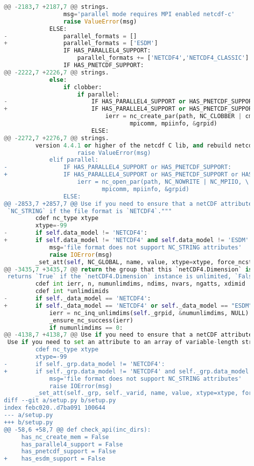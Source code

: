 \begin{lstlisting}[language=python,upquote=true]
@@ -2183,7 +2187,7 @@ strings.
                 msg='parallel mode requires MPI enabled netcdf-c'
                 raise ValueError(msg)
             ELSE:
-                parallel_formats = []
+                parallel_formats = ['ESDM']
                 IF HAS_PARALLEL4_SUPPORT:
                     parallel_formats += ['NETCDF4','NETCDF4_CLASSIC']
                 IF HAS_PNETCDF_SUPPORT:
@@ -2222,7 +2226,7 @@ strings.
             else:
                 if clobber:
                     if parallel:
-                        IF HAS_PARALLEL4_SUPPORT or HAS_PNETCDF_SUPPORT:
+                        IF HAS_PARALLEL4_SUPPORT or HAS_PNETCDF_SUPPORT or HAS_ESDM_SUPPORT:
                             ierr = nc_create_par(path, NC_CLOBBER | cmode, \
                                    mpicomm, mpiinfo, &grpid)
                         ELSE:
@@ -2272,7 +2276,7 @@ strings.
         version 4.4.1 or higher of the netcdf C lib, and rebuild netcdf4-python."""
                     raise ValueError(msg)
             elif parallel:
-                IF HAS_PARALLEL4_SUPPORT or HAS_PNETCDF_SUPPORT:
+                IF HAS_PARALLEL4_SUPPORT or HAS_PNETCDF_SUPPORT or HAS_ESDM_SUPPORT:
                     ierr = nc_open_par(path, NC_NOWRITE | NC_MPIIO, \
                            mpicomm, mpiinfo, &grpid)
                 ELSE:
@@ -2853,7 +2857,7 @@ Use if you need to ensure that a netCDF attribute is created with type
 `NC_STRING` if the file format is `NETCDF4`."""
         cdef nc_type xtype
         xtype=-99
-        if self.data_model != 'NETCDF4':
+        if self.data_model != 'NETCDF4' and self.data_model != 'ESDM':
             msg='file format does not support NC_STRING attributes'
             raise IOError(msg)
         _set_att(self, NC_GLOBAL, name, value, xtype=xtype, force_ncstring=True)
@@ -3435,7 +3435,7 @@ return the group that this `netCDF4.Dimension` is a member of."""
 returns `True` if the `netCDF4.Dimension` instance is unlimited, `False` otherwise."""
         cdef int ierr, n, numunlimdims, ndims, nvars, ngatts, xdimid
         cdef int *unlimdimids
-        if self._data_model == 'NETCDF4':
+        if self._data_model == 'NETCDF4' or self._data_model == "ESDM":
             ierr = nc_inq_unlimdims(self._grpid, &numunlimdims, NULL)
             _ensure_nc_success(ierr)
             if numunlimdims == 0:
@@ -4138,7 +4138,7 @@ Use if you need to ensure that a netCDF attribute is created with type
 Use if you need to set an attribute to an array of variable-length strings."""
         cdef nc_type xtype
         xtype=-99
-        if self._grp.data_model != 'NETCDF4':
+        if self._grp.data_model != 'NETCDF4' and self._grp.data_model != 'ESDM':
             msg='file format does not support NC_STRING attributes'
             raise IOError(msg)
         _set_att(self._grp, self._varid, name, value, xtype=xtype, force_ncstring=True)
diff --git a/setup.py b/setup.py
index febc020..d7ba091 100644
--- a/setup.py
+++ b/setup.py
@@ -58,6 +58,7 @@ def check_api(inc_dirs):
     has_nc_create_mem = False
     has_parallel4_support = False
     has_pnetcdf_support = False
+    has_esdm_support = False


\end{lstlisting}
